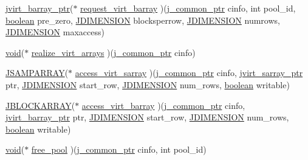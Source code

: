 \begin{DoxyCompactItemize}
\item 
\hyperlink{jpeglib_8h_a994f4cba141d82ded90af38e51223f0b}{jvirt\+\_\+barray\+\_\+ptr}($\ast$ \hyperlink{structjpeg__memory__mgr_a3cce60936329139d6b3d05fdb8fd7f73}{request\+\_\+virt\+\_\+barray} )(\hyperlink{jpeglib_8h_a1a177ab705cefea8f30ec31a48e62650}{j\+\_\+common\+\_\+ptr} cinfo, int pool\+\_\+id, \hyperlink{jconfig_8h_a7670a4e8a07d9ebb00411948b0bbf86d}{boolean} pre\+\_\+zero, \hyperlink{jmorecfg_8h_a04ed4674f6f1d0d50ec241531e38274f}{J\+D\+I\+M\+E\+N\+S\+I\+ON} blocksperrow, \hyperlink{jmorecfg_8h_a04ed4674f6f1d0d50ec241531e38274f}{J\+D\+I\+M\+E\+N\+S\+I\+ON} numrows, \hyperlink{jmorecfg_8h_a04ed4674f6f1d0d50ec241531e38274f}{J\+D\+I\+M\+E\+N\+S\+I\+ON} maxaccess)
\item 
\hyperlink{png_8h_ac9c84fa68bbad002983e35ce3663c686}{void}($\ast$ \hyperlink{structjpeg__memory__mgr_ac130f0c51a008fd80d75aa8c191e92a6}{realize\+\_\+virt\+\_\+arrays} )(\hyperlink{jpeglib_8h_a1a177ab705cefea8f30ec31a48e62650}{j\+\_\+common\+\_\+ptr} cinfo)
\item 
\hyperlink{jpeglib_8h_ac9d5d1b829ed51769db69a37271a7e91}{J\+S\+A\+M\+P\+A\+R\+R\+AY}($\ast$ \hyperlink{structjpeg__memory__mgr_ad9b919c342db4a8a4687834eec798232}{access\+\_\+virt\+\_\+sarray} )(\hyperlink{jpeglib_8h_a1a177ab705cefea8f30ec31a48e62650}{j\+\_\+common\+\_\+ptr} cinfo, \hyperlink{jpeglib_8h_abc0b975077507c35b5a577e3ce9e4d91}{jvirt\+\_\+sarray\+\_\+ptr} ptr, \hyperlink{jmorecfg_8h_a04ed4674f6f1d0d50ec241531e38274f}{J\+D\+I\+M\+E\+N\+S\+I\+ON} start\+\_\+row, \hyperlink{jmorecfg_8h_a04ed4674f6f1d0d50ec241531e38274f}{J\+D\+I\+M\+E\+N\+S\+I\+ON} num\+\_\+rows, \hyperlink{jconfig_8h_a7670a4e8a07d9ebb00411948b0bbf86d}{boolean} writable)
\item 
\hyperlink{jpeglib_8h_ab03cfeb937b60b9b73ca6e3cf935af49}{J\+B\+L\+O\+C\+K\+A\+R\+R\+AY}($\ast$ \hyperlink{structjpeg__memory__mgr_aad382fe923ef84b780a0fb6d6af0e6a0}{access\+\_\+virt\+\_\+barray} )(\hyperlink{jpeglib_8h_a1a177ab705cefea8f30ec31a48e62650}{j\+\_\+common\+\_\+ptr} cinfo, \hyperlink{jpeglib_8h_a994f4cba141d82ded90af38e51223f0b}{jvirt\+\_\+barray\+\_\+ptr} ptr, \hyperlink{jmorecfg_8h_a04ed4674f6f1d0d50ec241531e38274f}{J\+D\+I\+M\+E\+N\+S\+I\+ON} start\+\_\+row, \hyperlink{jmorecfg_8h_a04ed4674f6f1d0d50ec241531e38274f}{J\+D\+I\+M\+E\+N\+S\+I\+ON} num\+\_\+rows, \hyperlink{jconfig_8h_a7670a4e8a07d9ebb00411948b0bbf86d}{boolean} writable)
\item 
\hyperlink{png_8h_ac9c84fa68bbad002983e35ce3663c686}{void}($\ast$ \hyperlink{structjpeg__memory__mgr_a3fc57722021d2e656e5e63e6e3e6e45b}{free\+\_\+pool} )(\hyperlink{jpeglib_8h_a1a177ab705cefea8f30ec31a48e62650}{j\+\_\+common\+\_\+ptr} cinfo, int pool\+\_\+id)

\end{DoxyCompactItemize}
